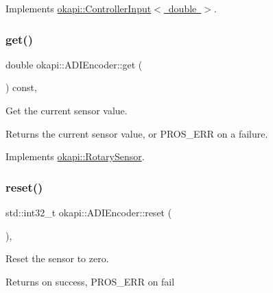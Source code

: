 Implements \mbox{\hyperlink{classokapi_1_1ControllerInput_a3c6c86d897983f367928a93890551e17}{okapi\+::\+Controller\+Input$<$ double $>$}}.

\mbox{\label{classokapi_1_1ADIEncoder_a1728a39cdb3e87e7c650961f34608f75}} 
\subsubsection{\texorpdfstring{get()}{get()}}
{\footnotesize\ttfamily double okapi\+::\+A\+D\+I\+Encoder\+::get (\begin{DoxyParamCaption}{ }\end{DoxyParamCaption}) const\hspace{0.3cm}{\ttfamily [override]}, {\ttfamily [virtual]}}

Get the current sensor value.

\begin{DoxyReturn}{Returns}
the current sensor value, or {\ttfamily P\+R\+O\+S\+\_\+\+E\+RR} on a failure. 
\end{DoxyReturn}


Implements \mbox{\hyperlink{classokapi_1_1RotarySensor_ac5534dc6c3bcbd8ea2f4e54a04cda734}{okapi\+::\+Rotary\+Sensor}}.

\mbox{\label{classokapi_1_1ADIEncoder_a8df70f75e1f23aa03eaa3e331fcab381}} 
\subsubsection{\texorpdfstring{reset()}{reset()}}
{\footnotesize\ttfamily std\+::int32\+\_\+t okapi\+::\+A\+D\+I\+Encoder\+::reset (\begin{DoxyParamCaption}{ }\end{DoxyParamCaption})\hspace{0.3cm}{\ttfamily [override]}, {\ttfamily [virtual]}}

Reset the sensor to zero.

\begin{DoxyReturn}{Returns}
{} on success, {\ttfamily P\+R\+O\+S\+\_\+\+E\+RR} on fail 
\end{DoxyReturn}


